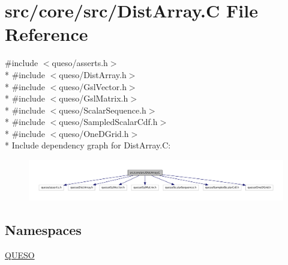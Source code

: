 \hypertarget{_dist_array_8_c}{\section{src/core/src/\-Dist\-Array.C File Reference}
\label{_dist_array_8_c}
}
{\ttfamily \#include $<$queso/asserts.\-h$>$}\\*
{\ttfamily \#include $<$queso/\-Dist\-Array.\-h$>$}\\*
{\ttfamily \#include $<$queso/\-Gsl\-Vector.\-h$>$}\\*
{\ttfamily \#include $<$queso/\-Gsl\-Matrix.\-h$>$}\\*
{\ttfamily \#include $<$queso/\-Scalar\-Sequence.\-h$>$}\\*
{\ttfamily \#include $<$queso/\-Sampled\-Scalar\-Cdf.\-h$>$}\\*
{\ttfamily \#include $<$queso/\-One\-D\-Grid.\-h$>$}\\*
Include dependency graph for Dist\-Array.\-C\-:
\nopagebreak
\begin{figure}[H]
\begin{center}
\leavevmode
\includegraphics[width=350pt]{_dist_array_8_c__incl}
\end{center}
\end{figure}
\subsection*{Namespaces}
\begin{DoxyCompactItemize}
\item 
\hyperlink{namespace_q_u_e_s_o}{Q\-U\-E\-S\-O}
\end{DoxyCompactItemize}

